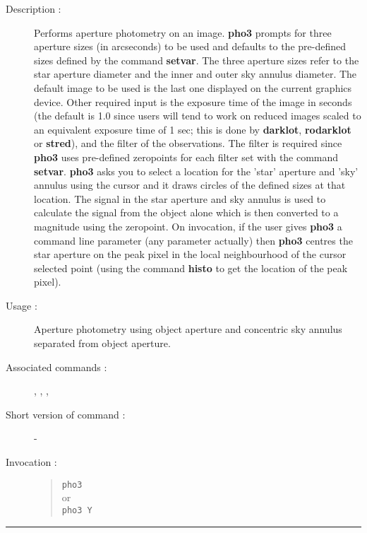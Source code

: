 \begin{description}

\item[Description :] Performs aperture photometry on an image.  {\bf
pho3} prompts for three aperture sizes (in arcseconds) to be used and
defaults to the pre-defined sizes defined by the command {\bf setvar}.
The three aperture sizes refer to the star aperture diameter and the
inner and outer sky annulus diameter.  The default image to be used is
the last one displayed on the current graphics device.  Other required
input is the exposure time of the image in seconds (the default is 1.0
since users will tend to work on reduced images scaled to an equivalent
exposure time of 1 sec; this is done by {\bf darklot}, {\bf rodarklot}
or {\bf stred}), and the filter of the observations.  The filter is
required since {\bf pho3} uses pre-defined zeropoints for each filter
set with the command {\bf setvar}. {\bf pho3} asks you to select a
location for the 'star' aperture and 'sky' annulus using the cursor and
it draws circles of the defined sizes at that location. The signal in
the star aperture and sky annulus is used to calculate the signal from
the object alone which is then converted to a magnitude using the
zeropoint.  On invocation, if the user gives {\bf pho3} a command line
parameter (any parameter actually) then {\bf pho3} centres the star
aperture on the peak pixel in the local neighbourhood of the cursor
selected point (using the command {\bf histo} to get the location of
the peak pixel).

\item [Usage :] Aperture photometry using object aperture and
concentric sky annulus separated from object aperture.

\item [Associated commands :] {\tt {}}, 
{\tt {}}, {\tt {}}, 
{\tt {}}

\item [Short version of command :] -

\item[Invocation :]

\begin{quote}{\tt  pho3 }\\
or \\
{\tt pho3 Y }
\end{quote}

\end{description}

\hrule 
